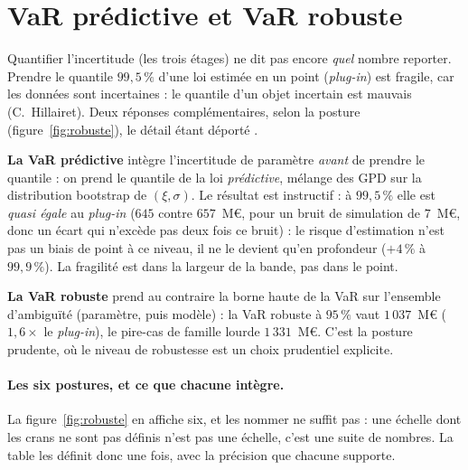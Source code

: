 \section{VaR prédictive et VaR robuste}

Quantifier l'incertitude (les trois étages) ne dit pas encore \emph{quel} nombre reporter.
Prendre le quantile $99{,}5\,\%$ d'une loi estimée en un point (\emph{plug-in}) est fragile,
car les données sont incertaines : \og{}le quantile d'un objet incertain est mauvais\fg{}
(C.~Hillairet). Deux réponses complémentaires, selon la posture (figure~\ref{fig:robuste}),
le détail étant déporté \matcomp.

\textbf{La VaR prédictive} intègre l'incertitude de paramètre \emph{avant} de prendre le
quantile : on prend le quantile de la loi \emph{prédictive}, mélange des GPD sur la distribution
bootstrap de $(\xi,\sigma)$. Le résultat est instructif : à $99{,}5\,\%$ elle est \emph{quasi
égale} au \emph{plug-in} ($645$ contre $657$~M\euro, pour un bruit de simulation de $7$~M\euro,
donc un écart qui n'excède pas deux fois ce bruit) : le risque d'estimation n'est pas un
biais de point à ce niveau, il ne le devient qu'en profondeur ($+4\,\%$ à $99{,}9\,\%$). La
fragilité est dans la largeur de la bande, pas dans le point.

\textbf{La VaR robuste} prend au contraire la borne haute de la VaR sur l'ensemble
d'ambiguïté (paramètre, puis modèle) : la VaR robuste à $95\,\%$ vaut $1\,037$~M\euro{}
($1{,}6\times$ le \emph{plug-in}), le pire-cas de famille lourde $1\,331$~M\euro. C'est la
posture prudente, où le niveau de robustesse est un choix prudentiel explicite.

\paragraph{Les six postures, et ce que chacune intègre.} La figure~\ref{fig:robuste} en affiche
six, et les nommer ne suffit pas : une échelle dont les crans ne sont pas définis n'est pas une
échelle, c'est une suite de nombres. La table les définit donc une fois, avec la précision que
chacune supporte.

